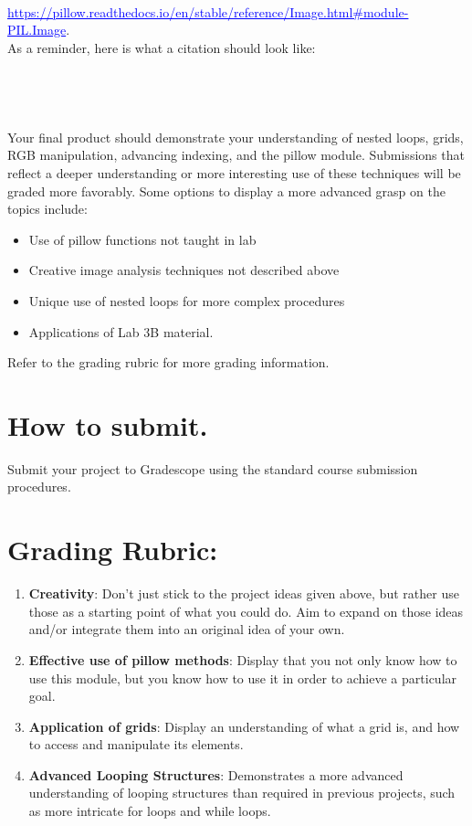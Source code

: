 \documentclass[11pt, letterpaper, onecolumn, oneside, final]{article}
\begin{document}
  \\ \textcolor{blue}{\underline{https://pillow.readthedocs.io/en/stable/reference/Image.html\#module-PIL.Image}}. 
  \\ As a reminder, here is what a citation should look like: \\ 
    \\
    \\
    \\ 
    \\
    Your final product should demonstrate your understanding of nested loops, grids, RGB manipulation, advancing indexing, and the {\consolas pillow} module.
    Submissions that reflect a deeper understanding or more interesting use of these techniques will be graded more favorably. Some options to display a more advanced grasp on the topics include:
\begin{itemize}
    \item Use of {\consolas pillow} functions not taught in lab
    \item Creative image analysis techniques not described above
    \item Unique use of nested loops for more complex procedures
    \item Applications of Lab 3B material.
\end{itemize}
    Refer to the grading rubric for more grading information.
    
\section{How to submit.}

    Submit your project to Gradescope using the standard course submission procedures. 
    \section{Grading Rubric:} 
    \begin{enumerate}
        \item \textbf{Creativity}: Don't just stick to the project ideas given above, but rather use those as a starting point of what you could do. Aim to expand on those ideas and/or integrate them into an original idea of your own.
        \item \textbf{Effective use of {\consolas pillow} methods}: Display that you not only know how to use this module, but you know how to use it in order to achieve a particular goal. 
        \item \textbf{Application of grids}: Display an understanding of what a grid is, and how to access and manipulate its elements.
        \item \textbf{Advanced Looping Structures}: Demonstrates a more advanced understanding of looping structures than required in previous projects, such as more intricate for loops and while loops.

    \end{enumerate}
\end{document}
